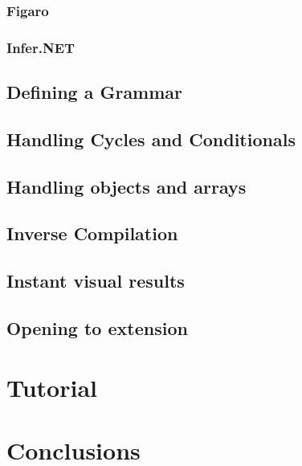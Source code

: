 \subsubsection{Figaro}

\subsubsection{Infer.NET}

\subsection{Defining a Grammar}

\subsection{Handling Cycles and Conditionals}

\subsection{Handling objects and arrays}

\subsection{Inverse Compilation}

\subsection{Instant visual results}

\subsection{Opening to extension}

\section{Tutorial}

\section{Conclusions}
